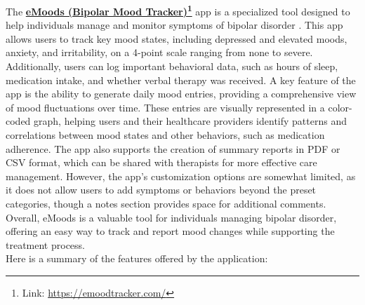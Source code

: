 The \textbf{\href{https://emoodtracker.com/}{eMoods (Bipolar Mood Tracker)}\footnote{Link: \url{https://emoodtracker.com/}}} app is a specialized tool designed to help individuals manage and monitor symptoms of bipolar disorder \cite{emoods-review}. This app allows users to track key mood states, including depressed and elevated moods, anxiety, and irritability, on a 4-point scale ranging from none to severe. Additionally, users can log important behavioral data, such as hours of sleep, medication intake, and whether verbal therapy was received. A key feature of the app is the ability to generate daily mood entries, providing a comprehensive view of mood fluctuations over time. These entries are visually represented in a color-coded graph, helping users and their healthcare providers identify patterns and correlations between mood states and other behaviors, such as medication adherence. The app also supports the creation of summary reports in PDF or CSV format, which can be shared with therapists for more effective care management. However, the app's customization options are somewhat limited, as it does not allow users to add symptoms or behaviors beyond the preset categories, though a notes section provides space for additional comments. Overall, eMoods is a valuable tool for individuals managing bipolar disorder, offering an easy way to track and report mood changes while supporting the treatment process.\vspace{5mm} \\
Here is a summary of the features offered by the application:\vspace{5mm}

